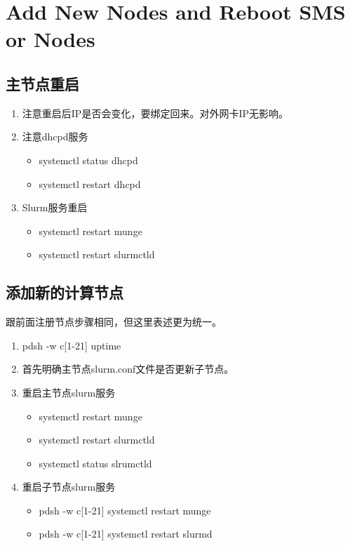 {\section{Add New Nodes and Reboot SMS or Nodes}
\subsection{主节点重启}
\begin{enumerate}
\item 注意重启后IP是否会变化，要绑定回来。对外网卡IP无影响。

\item 注意dhcpd服务
\begin{itemize}
\item systemctl status dhcpd
\item systemctl restart dhcpd
\end{itemize}

\item Slurm服务重启
\begin{itemize}
\item systemctl restart munge
\item systemctl restart slurmctld
\end{itemize}
\end{enumerate}


\subsection{添加新的计算节点}
跟前面注册节点步骤相同，但这里表述更为统一。
\begin{enumerate}
\item pdsh -w c[1-21] uptime

\item 首先明确主节点slurm.conf文件是否更新子节点。

\item 重启主节点slurm服务
\begin{itemize}
\item systemctl restart munge
\item systemctl restart slurmctld
\item systemctl status slrumctld
\end{itemize}

\item 重启子节点slurm服务
\begin{itemize}
\item pdsh -w c[1-21] systemctl restart munge
\item pdsh -w c[1-21] systemctl restart slurmd
\end{itemize}


\end{enumerate}}
